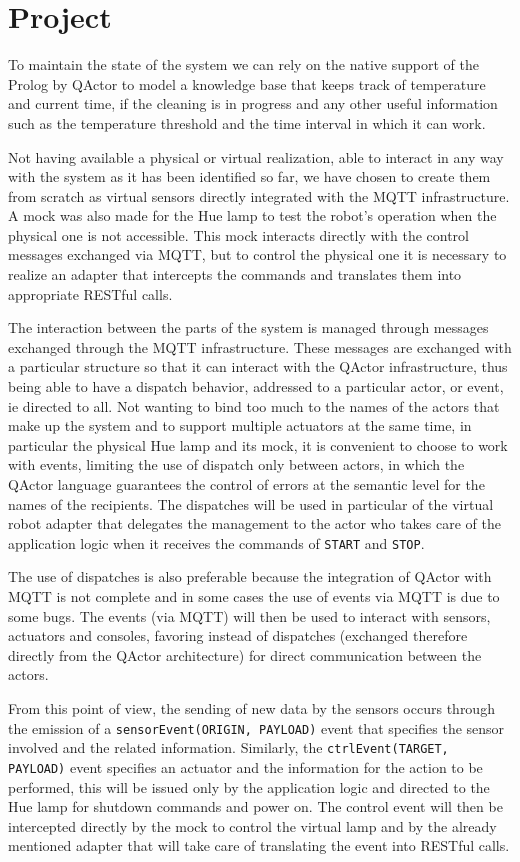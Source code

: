 \section{Project}
To maintain the state of the system we can rely on the native support of the Prolog by QActor to model a knowledge base that keeps track of temperature and current time, if the cleaning is in progress and any other useful information such as the temperature threshold and the time interval in which it can work.

Not having available a physical or virtual realization, able to interact in any way with the system as it has been identified so far, we have chosen to create them from scratch as virtual sensors directly integrated with the MQTT infrastructure. A mock was also made for the Hue lamp to test the robot's operation when the physical one is not accessible. This mock interacts directly with the control messages exchanged via MQTT, but to control the physical one it is necessary to realize an adapter that intercepts the commands and translates them into appropriate RESTful calls.

The interaction between the parts of the system is managed through messages exchanged through the MQTT infrastructure. These messages are exchanged with a particular structure so that it can interact with the QActor infrastructure, thus being able to have a dispatch behavior, addressed to a particular actor, or event, ie directed to all. Not wanting to bind too much to the names of the actors that make up the system and to support multiple actuators at the same time, in particular the physical Hue lamp and its mock, it is convenient to choose to work with events, limiting the use of dispatch only between actors, in which the QActor language guarantees the control of errors at the semantic level for the names of the recipients. The dispatches will be used in particular of the virtual robot adapter that delegates the management to the actor who takes care of the application logic when it receives the commands of \texttt{START} and \texttt{STOP}.

The use of dispatches is also preferable because the integration of QActor with MQTT is not complete and in some cases the use of events via MQTT is due to some bugs. The events (via MQTT) will then be used to interact with sensors, actuators and consoles, favoring instead of dispatches (exchanged therefore directly from the QActor architecture) for direct communication between the actors.

From this point of view, the sending of new data by the sensors occurs through the emission of a \texttt{sensorEvent(ORIGIN, PAYLOAD)} event that specifies the sensor involved and the related information. Similarly, the \texttt{ctrlEvent(TARGET, PAYLOAD)} event specifies an actuator and the information for the action to be performed, this will be issued only by the application logic and directed to the Hue lamp for shutdown commands and power on. The control event will then be intercepted directly by the mock to control the virtual lamp and by the already mentioned adapter that will take care of translating the event into RESTful calls.

